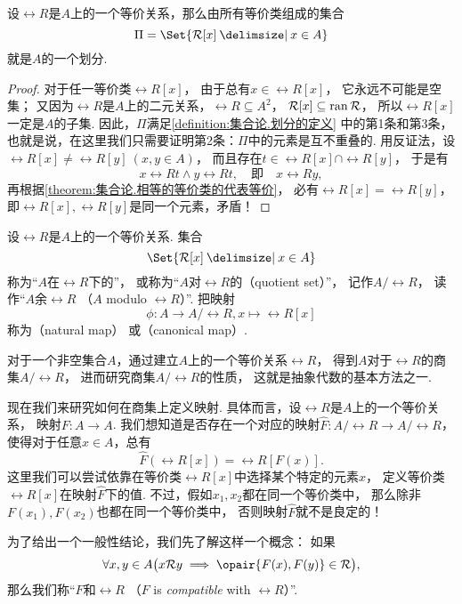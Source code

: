 \begin{theorem}
设\(\rel{R}\)是\(A\)上的一个等价关系，那么由所有等价类组成的集合\[
	\Pi = \Set{ \rel{R}[x] \given x \in A }
\]就是\(A\)的一个划分.
\begin{proof}
对于任一等价类\(\rel{R}[x]\)，
由于总有\(x \in \rel{R}[x]\)，
它永远不可能是空集；
又因为\(\rel{R}\)是\(A\)上的二元关系，\(\rel{R} \subseteq A^2\)，
\(\mathcal{R}[x] \subseteq \operatorname{ran} \mathcal{R}\)，
所以\(\rel{R}[x]\)一定是\(A\)的子集.
因此，\(\Pi\)满足\cref{definition:集合论.划分的定义} 中的第1条和第3条，
也就是说，在这里我们只需要证明第2条：\(\Pi\)中的元素是互不重叠的.
用反证法，设\(\rel{R}[x] \neq \rel{R}[y]\ (x,y \in A)\)，
而且存在\(t \in \rel{R}[x] \cap \rel{R}[y]\)，
于是有\[
	x \rel{R} t \land y \rel{R} t,
	\quad\text{即}\quad
	x \rel{R} y,
\]
再根据\cref{theorem:集合论.相等的等价类的代表等价}，
必有\(\rel{R}[x] = \rel{R}[y]\)，
即\(\rel{R}[x],\rel{R}[y]\)是同一个元素，矛盾！
\end{proof}
\end{theorem}

\begin{definition}
设\(\rel{R}\)是\(A\)上的一个等价关系.
集合\[
	\Set{ \rel{R}[x] \given x \in A }
\]称为“\(A\)在\(\rel{R}\)下的”，
或称为“\(A\)对\(\rel{R}\)的（quotient set）”，
记作\(A/\rel{R}\)，
读作“\(A\)余\(\rel{R}\)
（\(A\) modulo \(\rel{R}\)）”.
把映射\[
	\phi\colon A \to A/\rel{R}, x \mapsto \rel{R}[x]
\]称为（natural map）%
或（canonical map）.
\end{definition}
对于一个非空集合\(A\)，通过建立\(A\)上的一个等价关系\(\rel{R}\)，
得到\(A\)对于\(\rel{R}\)的商集\(A/\rel{R}\)，
进而研究商集\(A/\rel{R}\)的性质，
这就是抽象代数的基本方法之一.

现在我们来研究如何在商集上定义映射.
具体而言，设\(\rel{R}\)是\(A\)上的一个等价关系，
映射\(F\colon A \to A\).
我们想知道是否存在一个对应的映射\(\hat{F}\colon A/\rel{R} \to A/\rel{R}\)，
使得对于任意\(x \in A\)，总有\[
	\hat{F}(\rel{R}[x]) = \rel{R}[F(x)].
\]
这里我们可以尝试依靠在等价类\(\rel{R}[x]\)中选择某个特定的元素\(x\)，
定义等价类\(\rel{R}[x]\)在映射\(\hat{F}\)下的值.
不过，假如\(x_1,x_2\)都在同一个等价类中，
那么除非\(F(x_1),F(x_2)\)也都在同一个等价类中，
否则映射\(\hat{F}\)就不是良定的！

为了给出一个一般性结论，我们先了解这样一个概念：
如果\[
	\forall x,y \in A \bigl(
		x \rel{R} y
		\implies
		\opair{F(x),F(y)} \in \rel{R}
	\bigr),
\]
那么我们称“\(F\)和\(\rel{R}\) %
（\(F\) is \emph{compatible} with \(\rel{R}\)）”.

